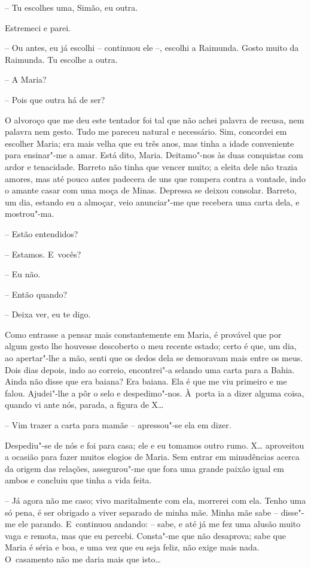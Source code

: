 -- Tu escolhes uma, Simão, eu outra.

Estremeci e parei.

-- Ou antes, eu já escolhi -- continuou ele --, escolhi a Raimunda.
Gosto muito da Raimunda. Tu escolhe a outra.

-- A Maria?

-- Pois que outra há de ser?

O alvoroço que me deu este tentador foi tal que não achei palavra de
recusa, nem palavra nem gesto. Tudo me pareceu natural e necessário.
Sim, concordei em escolher Maria; era mais velha que eu três anos, mas
tinha a idade conveniente para ensinar"-me a amar. Está dito, Maria.
Deitamo"-nos às duas conquistas com ardor e tenacidade. Barreto não tinha
que vencer muito; a eleita dele não trazia amores, mas até pouco antes
padecera de uns que rompera contra a vontade, indo o amante casar com
uma moça de Minas. Depressa se deixou consolar. Barreto, um dia, estando
eu a almoçar, veio anunciar"-me que recebera uma carta dela, e
mostrou"-ma.

-- Estão entendidos?

-- Estamos. E~vocês?

-- Eu não.

-- Então quando?

-- Deixa ver, eu te digo.

Como entrasse a pensar mais constantemente em Maria, é provável que por
algum gesto lhe houvesse descoberto o meu recente estado; certo é que,
um dia, ao apertar"-lhe a mão, senti que os dedos dela se demoravam mais
entre os meus. Dois dias depois, indo ao correio, encontrei"-a selando
uma carta para a Bahia. Ainda não disse que era baiana? Era baiana. Ela
é que me viu primeiro e me falou. Ajudei"-lhe a pôr o selo e
despedimo"-nos. À~porta ia a dizer alguma coisa, quando vi ante nós,
parada, a figura de X\ldots{}

-- Vim trazer a carta para mamãe -- apressou"-se ela em dizer.

Despediu"-se de nós e foi para casa; ele e eu tomamos outro rumo. X\ldots{}
aproveitou a ocasião para fazer muitos elogios de Maria. Sem entrar em
minudências acerca da origem das relações, assegurou"-me que fora uma
grande paixão igual em ambos e concluiu que tinha a vida feita.

-- Já agora não me caso; vivo maritalmente com ela, morrerei com ela.
Tenho uma só pena, é ser obrigado a viver separado de minha mãe. Minha
mãe sabe -- disse"-me ele parando. E~continuou andando: -- sabe, e até já
me fez uma alusão muito vaga e remota, mas que eu percebi. Consta"-me que
não desaprova; sabe que Maria é séria e boa, e uma vez que eu seja
feliz, não exige mais nada. O~casamento não me daria mais que isto\ldots{}

